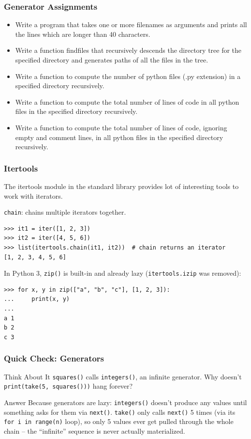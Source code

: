 \begin{frame}[fragile]\frametitle{Generator Assignments}
    \begin{itemize}
    \item Write a program that takes one or more filenames as arguments and prints all the lines which are longer than 40 characters.
    \item  Write a function findfiles that recursively descends the directory tree for the specified directory and generates paths of all the files in the tree.
    \item Write a function to compute the number of python files (.py extension) in a specified directory recursively.
\item Write a function to compute the total number of lines of code in all python files in the specified directory recursively.
\item Write a function to compute the total number of lines of code, ignoring empty and comment lines, in all python files in the specified directory recursively.
    \end{itemize}
\end{frame}

\begin{frame}[fragile]\frametitle{Itertools}
The itertools module in the standard library provides lot of interesting tools to work with iterators.

\lstinline|chain|: chains multiple iterators together.
\begin{lstlisting}
>>> it1 = iter([1, 2, 3])
>>> it2 = iter([4, 5, 6])
>>> list(itertools.chain(it1, it2))  # chain returns an iterator
[1, 2, 3, 4, 5, 6]
\end{lstlisting}
In Python 3, \lstinline|zip()| is built-in and already lazy (\lstinline|itertools.izip| was removed):
\begin{lstlisting}
>>> for x, y in zip(["a", "b", "c"], [1, 2, 3]):
...     print(x, y)
...
a 1
b 2
c 3
\end{lstlisting}
\end{frame}

\begin{frame}[fragile]\frametitle{Quick Check: Generators}
\begin{block}{Think About It}
\lstinline|squares()| calls \lstinline|integers()|, an infinite generator. Why doesn't
\lstinline|print(take(5, squares()))| hang forever?
\end{block}
\pause
\begin{block}{Answer}
Because generators are lazy: \lstinline|integers()| doesn't produce any values until something
asks for them via \lstinline|next()|. \lstinline|take()| only calls \lstinline|next()| 5 times
(via its \lstinline|for i in range(n)| loop), so only 5 values ever get pulled through the whole
chain -- the ``infinite'' sequence is never actually materialized.
\end{block}
\end{frame}


